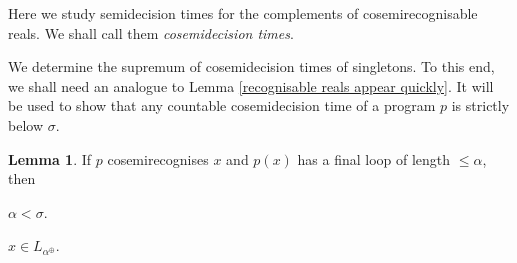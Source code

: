 \documentclass[a4paper,11pt]{amsart}
\theoremstyle{definition}
\newtheorem{lemma}[fact]{Lemma}
\newtheorem*{problem A}{Problem 1}
\newtheorem*{problem B}{Problem 2}
\theoremstyle{remark}
\newenvironment{enumerate-(1)}{\begin{enumerate}[label={\upshape (\arabic*)}, leftmargin=2pc]}{\end{enumerate}}
\begin{document}
Here we study semidecision times for the complements of cosemirecognisable reals. 
We shall call them \emph{cosemidecision times}. 

We determine the supremum of cosemidecision times of singletons. 
To this end, we shall need an analogue to Lemma \ref{recognisable reals appear quickly}. 
It will be used to show that
any countable cosemidecision time of a program $p$ is strictly below $\sigma$.

\begin{lemma} 
\label{cosemirecognisable reals appear quickly} 
If $p$ cosemirecognises $x$ and $p(x)$ has a final loop of length  $\leq \alpha$, then 
\begin{enumerate-(1)} 
\item 
\label{cosemirecognisable reals appear quickly 1} 
$\alpha < \sigma$. 
\item 
\label{cosemirecognisable reals appear quickly 2} 
$x\in L_{\alpha^\oplus}$. 
\end{enumerate-(1)} 
\end{lemma} 
\end{document}
